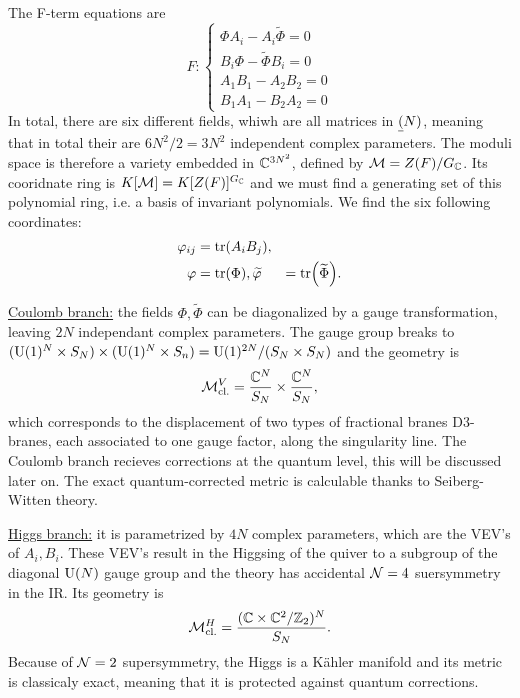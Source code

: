         The F-term equations are
        \begin{equation}
            F:
            \begin{cases}
                \Phi A_i-A_i\tilde{\Phi} = 0\\
                B_i\Phi-\tilde{\Phi}B_i = 0\\
                A_1B_1-A_2B_2 = 0\\
                B_1A_1-B_2A_2 = 0
            \end{cases}
        \end{equation}
        In total, there are six different fields, whiwh are all matrices in $\underline{(}N)$, meaning that in total their are $6N^2/2=3N^2$ independent complex parameters. The moduli space is therefore a variety embedded in $\mathbb{C}^{3N^2}$, defined by $\mathcal{M}=Z(F)/G_{\mathbb{C}}$. Its cooridnate ring is $K[\mathcal{M}]=K[Z(F)]^{G_{\mathbb{C}}}$ and we must find a generating set of this polynomial ring, i.e. a basis of invariant polynomials. We find the six following coordinates:
        \begin{align}
            \varphi_{ij} &= \tr (A_i B_j),\\
            \varphi &= \tr(\Phi),
            \widetilde{\varphi} &= \tr(\widetilde{\Phi}).
        \end{align}

        \underline{Coulomb branch:} the fields $\Phi,\tilde{\Phi}$ can be diagonalized by a gauge transformation, leaving $2N$ independant complex parameters. The gauge group breaks to $(\text{U}(1)^{N}\times S_N)\times(\text{U}(1)^{N}\times S_n)=\text{U}(1)^{2N}/(S_N\times S_N)$ and the geometry is
        \begin{equation}
            \mathcal{M}^V_{\text{cl.}} = \frac{\mathbb{C}^N}{S_N}\times\frac{\mathbb{C}^N}{S_N},
        \end{equation}
        which corresponds to the displacement of two types of fractional branes D$3$-branes, each associated to one gauge factor, along the singularity line. The Coulomb branch recieves corrections at the quantum level, this will be discussed later on. The exact quantum-corrected metric is calculable thanks to Seiberg-Witten theory\cite{Witten_1997}.


        \underline{Higgs branch:} it is parametrized by $4N$ complex parameters, which are the VEV's of $A_i,B_i$. These VEV's result in the Higgsing of the quiver to a subgroup of the diagonal $\text{U}(N)$ gauge group and the theory has accidental $\mathcal{N}=4$ suersymmetry in the IR. Its geometry is
        \begin{equation}
            \mathcal{M}^H_{\text{cl.}} = \frac{(\mathbb{C}\times\mathbb{C}^2/\mathbb{Z}_2)^N}{S_N}.
        \end{equation}
        Because of $\mathcal{N}=2$ supersymmetry, the Higgs is a Kähler manifold and its metric is classicaly exact, meaning that it is protected against quantum corrections.

